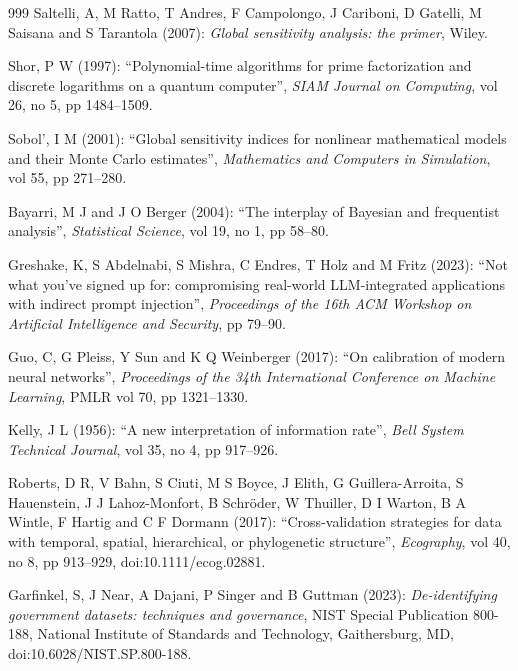 \begin{thebibliography}{999}
Saltelli, A, M Ratto, T Andres, F Campolongo, J Cariboni, D Gatelli, M Saisana and S Tarantola (2007): \emph{Global sensitivity analysis: the primer}, Wiley.

Shor, P W (1997): ``Polynomial-time algorithms for prime factorization and discrete logarithms on a quantum computer'', \emph{SIAM Journal on Computing}, vol 26, no 5, pp 1484--1509.

Sobol', I M (2001): ``Global sensitivity indices for nonlinear mathematical models and their Monte Carlo estimates'', \emph{Mathematics and Computers in Simulation}, vol 55, pp 271--280.

Bayarri, M J and J O Berger (2004): ``The interplay of Bayesian and frequentist analysis'', \emph{Statistical Science}, vol 19, no 1, pp 58--80.

Greshake, K, S Abdelnabi, S Mishra, C Endres, T Holz and M Fritz (2023): ``Not what you've signed up for: compromising real-world LLM-integrated applications with indirect prompt injection'', \emph{Proceedings of the 16th ACM Workshop on Artificial Intelligence and Security}, pp 79--90.

Guo, C, G Pleiss, Y Sun and K Q Weinberger (2017): ``On calibration of modern neural networks'', \emph{Proceedings of the 34th International Conference on Machine Learning}, PMLR vol 70, pp 1321--1330.

Kelly, J L (1956): ``A new interpretation of information rate'', \emph{Bell System Technical Journal}, vol 35, no 4, pp 917--926.

Roberts, D R, V Bahn, S Ciuti, M S Boyce, J Elith, G Guillera-Arroita, S Hauenstein, J J Lahoz-Monfort, B Schr\"oder, W Thuiller, D I Warton, B A Wintle, F Hartig and C F Dormann (2017): ``Cross-validation strategies for data with temporal, spatial, hierarchical, or phylogenetic structure'', \emph{Ecography}, vol 40, no 8, pp 913--929, doi:10.1111/ecog.02881.

Garfinkel, S, J Near, A Dajani, P Singer and B Guttman (2023): \emph{De-identifying government datasets: techniques and governance}, NIST Special Publication 800-188, National Institute of Standards and Technology, Gaithersburg, MD, doi:10.6028/NIST.SP.800-188.


\end{thebibliography}
